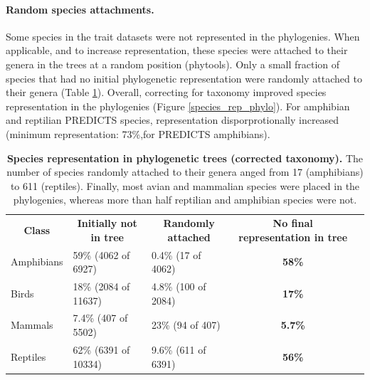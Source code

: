 \paragraph{Random species attachments.} Some species in the trait datasets were not represented in the phylogenies. When applicable, and to increase representation, these species were attached to their genera in the trees at a random position (phytools). Only a small fraction of species that had no initial phylogenetic representation were randomly attached to their genera (Table \ref{random_attachments_phy}).
Overall, correcting for taxonomy improved species representation in the phylogenies (Figure \ref{species_rep_phylo}). For amphibian and reptilian PREDICTS species, representation disporprotionally increased (minimum representation: 73\%,for PREDICTS amphibians). 

\begin{table}[h!]
\renewcommand{\baselinestretch}{1}
\renewcommand{\arraystretch}{1.5}
\begin{center}\fontsize{9}{11}\selectfont
\caption[Species representation in phylogenetic trees (corrected taxonomy)]{\textbf{Species representation in phylogenetic trees (corrected taxonomy).} The number of species randomly attached to their genera anged from 17 (amphibians) to 611 (reptiles). Finally, most avian and mammalian species were placed in the phylogenies, whereas more than half reptilian and amphibian species were not.} 
\label{random_attachments_phy}
\begin{tabular}{|l|l|l|c|l}
\cline{1-4}
\multicolumn{1}{|c|}{\textbf{Class}} & \multicolumn{1}{c|}{\textbf{Initially not in tree}} & \multicolumn{1}{c|}{\textbf{Randomly attached}} & \textbf{No final representation in tree} &  \\ \cline{1-4}
Amphibians                  & 59\% (4062 of 6927)                           & 0.4\% (17 of 4062)                     & \textbf{58\%}             &  \\ \cline{1-4}
Birds                       & 18\% (2084 of 11637)                          & 4.8\% (100 of 2084)                    & \textbf{17\%}             &  \\ \cline{1-4}
Mammals                     & 7.4\% (407 of 5502)                           & 23\% (94 of 407)                       & \textbf{5.7\%}            &  \\ \cline{1-4}
Reptiles                    & 62\% (6391 of 10334)                          & 9.6\% (611 of 6391)                    & \textbf{56\%}             &  \\ \cline{1-4}
\end{tabular}
\end{center}
\end{table}

